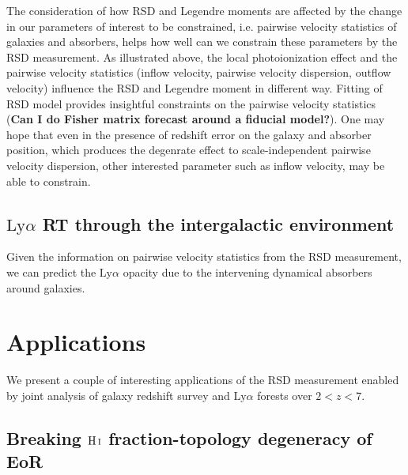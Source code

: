 \documentclass[useAMS,usenatbib,twocolumn]{mn2e}
\newcommand{\HI}{{\rm H\,{\scriptstyle I}}}
\newcommand{\LyA}{\mbox{Ly}\alpha}
\begin{document}
The consideration of how RSD and Legendre moments are affected by
the change in our parameters of interest to be constrained, i.e.
pairwise velocity statistics of galaxies and absorbers, helps
how well can we constrain these parameters by the RSD measurement.
As illustrated above, the local photoionization effect and the 
pairwise velocity statistics (inflow velocity, pairwise velocity
dispersion, outflow velocity) influence the RSD and Legendre
moment in different way. Fitting of RSD model provides insightful
constraints on the pairwise velocity statistics 
(\textbf{Can I do Fisher matrix forecast around a fiducial model?}).
One may hope that even in the presence of redshift error on the
galaxy and absorber position, which produces the degenrate effect to
scale-independent pairwise velocity dispersion, other interested 
parameter such as inflow velocity, may be able to constrain.


\subsection{$\LyA$ RT through the intergalactic environment}

Given the information on pairwise velocity statistics from the 
RSD measurement, we can predict the $\LyA$ opacity due to the 
intervening dynamical absorbers around galaxies.




\section{Applications}
We present a couple of interesting applications of the RSD measurement 
enabled by joint analysis of galaxy redshift survey and $\LyA$ forests
over $2<z<7$. 



\subsection{Breaking $\HI$ fraction-topology degeneracy of EoR}
\end{document}
